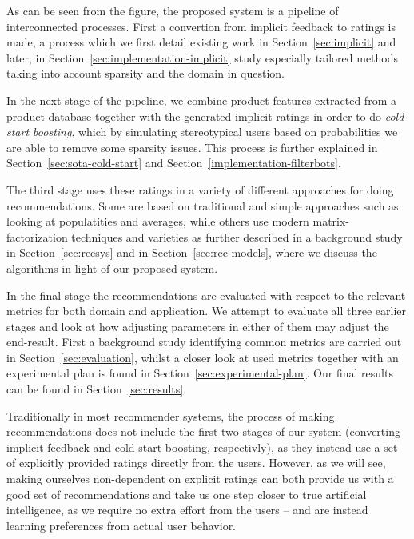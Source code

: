 As can be seen from the figure, the proposed system is a pipeline of
interconnected processes. First a convertion from implicit feedback to ratings
is made, a process which we first detail existing work in
Section~\ref{sec:implicit} and later, in
Section~\ref{sec:implementation-implicit} study especially tailored methods
taking into account sparsity and the domain in question.

In the next stage of the pipeline, we combine product features extracted from a
product database together with the generated implicit ratings in order to do
\textit{cold-start boosting}, which by simulating stereotypical users based on
probabilities we are able to remove some sparsity issues. This process is
further explained in Section~\ref{sec:sota-cold-start} and
Section~\ref{implementation-filterbots}.

The third stage uses these ratings in a variety of different approaches for
doing recommendations. Some are based on traditional and simple approaches such
as looking at populatities and averages, while others use modern
matrix-factorization techniques and varieties as further described in a
background study in Section~\ref{sec:recsys} and in
Section~\ref{sec:rec-models}, where we discuss the algorithms in light of our
proposed system.

In the final stage the recommendations are evaluated with respect to the
relevant metrics for both domain and application. We attempt to evaluate all
three earlier stages and look at how adjusting parameters in either of them may
adjust the end-result. First a background study identifying common metrics are
carried out in Section~\ref{sec:evaluation}, whilst a closer look at used
metrics together with an experimental plan is found in
Section~\ref{sec:experimental-plan}. Our final results can be found in
Section~\ref{sec:results}.

Traditionally in most recommender systems, the process of making
recommendations does not include the first two stages of our system (converting
implicit feedback and cold-start boosting, respectivly), as they instead use a
set of explicitly provided ratings directly from the users. However, as we will
see, making ourselves non-dependent on explicit ratings can both provide us
with a good set of recommendations and take us one step closer to true
artificial intelligence, as we require no extra effort from the users -- and are
instead learning preferences from actual user behavior.

